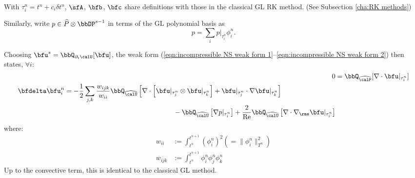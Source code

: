 \begin{example}
        With $\tau^{n}_{i} = t^{n} + c_{i}\delta t^{n}$, $\sfA$, $\bfb$, $\bfc$ share definitions with those in the classical GL RK method. (See Subsection \ref{cha:RK methods})

        Similarly, write $p \in \widehat{P}\otimes\bbDP^{s - 1}$ in terms of the GL polynomial basis as
        \begin{equation}
            p  =  \sum_{i}p|_{\tau^{n}_{i}}\phi^{n}_{i}.
        \end{equation}

        Choosing $\bfu^{*} = \bbQ_{\partial_{t}\calU}[\bfu]$, the weak form (\ref{eqn:incompressible NS weak form 1}--\ref{eqn:incompressible NS weak form 2}) then states, $\forall i$:
        \begin{align}
                                                                                0  &=  \bbQ_{\widehat{\calP}}[\nabla\cdot\bfu|_{\tau^{n}_{i}}]  \\
            \begin{split}
                \bfdelta\bfu^{n}_{i}  &=  - \frac{1}{2}\sum_{j, k}\frac{w_{ijk}}{w_{ii}}\bbQ_{\widehat{\calU}}\left[\nabla\cdot\left[\bfu|_{\tau^{n}_{j}}\otimes\bfu|_{\tau^{n}_{k}}\right] + \bfu|_{\tau^{n}_{j}}\cdot\nabla\bfu|_{\tau^{n}_{k}}\right]  \\
                                      &\qquad\qquad\qquad\qquad\qquad\qquad\qquad\qquad- \bbQ_{\widehat{\calU}}\left[\nabla p|_{\tau^{n}_{i}}\right] + \frac{2}{\rmRe}\bbQ_{\widehat{\calU}}\left[\nabla\cdot\nabla_{\rms}\bfu|_{\tau^{n}_{i}}\right]
            \end{split}
        \end{align}
        where:
        \begin{align}
            w_{ii}   &:=  \int_{t^{n}}^{t^{n + 1}}(\phi^{n}_{i})^{2}  \left(=  \|\phi^{n}_{i}\|_{T^{n}}^{2}\right)  \\
            w_{ijk}  &:=  \int_{t^{n}}^{t^{n + 1}}\phi^{n}_{i}\phi^{n}_{j}\phi^{n}_{k}
        \end{align}
        Up to the convective term, this is identical to the classical GL method.
        

\end{example}
